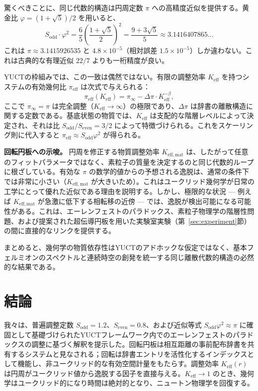 \documentclass[12pt,a4paper]{article}
\newcommand{\Sodd}{S_{\mathrm{odd}}}
\newcommand{\Seven}{S_{\mathrm{even}}}
\begin{document}
	驚くべきことに、同じ代数的構造は円周定数 \(\pi\) への高精度近似を提供する。黄金比 \(\varphi = (1+\sqrt{5})/2\) を用いると、
	\begin{equation}
		S_{\mathrm{odd}} \cdot \varphi^2 = \frac{6}{5} \left( \frac{1+\sqrt{5}}{2} \right)^2 
		= \frac{9+3\sqrt{5}}{5} \approx 3.1416407865\dots
	\end{equation}
	これは \(\pi \approx 3.1415926535\) と \(4.8\times10^{-5}\)（相対誤差 \(1.5\times10^{-5}\)）しか違わない。これは古典的な有理近似 \(22/7\) よりも一桁精度が良い。
	
	YUCTの枠組みでは、この一致は偶然ではない。有限の調整効率 \(K_{\mathrm{eff}}\) を持つシステムの有効幾何比 \(\pi_{\mathrm{eff}}\) は次式で与えられる：
	\begin{equation}
		\pi_{\mathrm{eff}}(K_{\mathrm{eff}}) = \pi_{\infty} - \Delta\pi \cdot K_{\mathrm{eff}}^{-\beta},
	\end{equation}
	ここで \(\pi_{\infty} = \pi\) は完全調整（\(K_{\mathrm{eff}} \to \infty\)）の極限であり、\(\Delta\pi\) は辞書の離散構造に関する定数である。基底状態の物質では、\(K_{\mathrm{eff}}\) は支配的な階層レベルによって決定され、それは比 \(S_{\mathrm{odd}}/S_{\mathrm{even}} = 3/2\) によって特徴づけられる。これをスケーリング則に代入すると \(\pi_{\mathrm{eff}} \approx S_{\mathrm{odd}}\varphi^2\) が得られる。
	
	\textbf{回転円板への示唆。}
	円周を修正する物質調整効率 \(K_{\mathrm{eff,mat}}\) は、したがって任意のフィットパラメータではなく、素粒子の質量を決定するのと同じ代数的ループに根ざしている。有効な \(\pi\) の数学的値からの予想される逸脱は、通常の条件下では非常に小さい（\(K_{\mathrm{eff,mat}}\) が大きいため）。これはユークリッド幾何学が日常の工学にとって優れた近似である理由を説明する。しかし、極限的な状況 — 例えば \(K_{\mathrm{eff,mat}}\) が急激に低下する相転移の近傍 — では、逸脱が検出可能になる可能性がある。これは、エーレンフェストのパラドックス、素粒子物理学の階層性問題、および提案された超伝導円板を用いた実験室実験（第~\ref{sec:experiment}節）の間に直接的なリンクを提供する。
	
	まとめると、幾何学の物質依存性はYUCTのアドホックな仮定ではなく、基本フェルミオンのスペクトルと連続時空の創発を統一する同じ離散代数的構造の必然的な結果である。
	
	\section{結論}
	\label{sec:conclusion}
	
	我々は、普遍調整定数 \(\Sodd = 1.2\)、\(\Seven = 0.8\)、および近似等式 \(\Sodd \varphi^2 \approx \pi\) に確固として基礎づけられたYUCTフレームワーク内でのエーレンフェストのパラドックスの調整に基づく解釈を提示した。回転円板は相互距離の事前配布辞書を共有するシステムと見なされる；回転は辞書エントリを活性化するインデックスとして機能し、非ユークリッド的な有効空間計量をもたらす。調整効率 \(K_{\mathrm{eff}}(r)\) は円周がユークリッド値から逸脱する因子を直接与える。\(K_{\mathrm{eff}} \to 1\) のとき、幾何学はユークリッド的になり時間は絶対的となり、ニュートン物理学を回復する。
	
\end{document}

